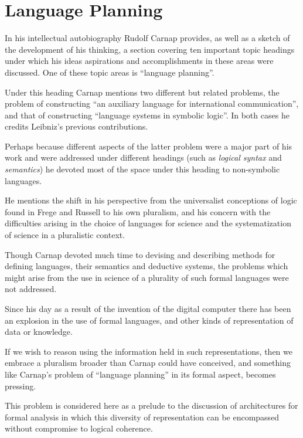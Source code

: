 
\chapter{Language Planning}\label{LanguagePlanning}

In his intellectual autobiography \cite{carnap63} Rudolf Carnap
provides, as well as a sketch of the development of his thinking, a
section covering ten important topic headings under which his ideas
aspirations and accomplishments in these areas were discussed. 
One of these topic areas is ``language planning''.

Under this heading Carnap mentions two different but related problems,
the problem of constructing ``an auxiliary language for international
communication'', and that of constructing ``language systems in
symbolic logic''. 
In both cases he credits Leibniz's previous contributions.

Perhaps because different aspects of the latter problem were a major
part of his work and were addressed under different headings (such as
\emph{logical syntax} and \emph{semantics}) he devoted most of the
space under this heading to non-symbolic languages.

He mentions the shift in his perspective from the universalist
conceptions of logic found in Frege and Russell to his own pluralism,
and his concern with the difficulties arising in the choice of
languages for science and the systematization of science in a
pluralistic context. 

Though Carnap devoted much time to devising and describing methods for
defining languages, their semantics and deductive systems, the
problems which might arise from the use in science of a plurality of
such formal languages were not addressed. 

Since his day as a result of the invention of the digital computer
there has been an explosion in the use of formal languages, and other
kinds of representation of data or knowledge.

If we wish to reason using the information held in such
representations, then we embrace a pluralism broader than Carnap could
have conceived, and something like Carnap's problem of ``language
planning'' in its formal aspect, becomes pressing.

This problem is considered here as a prelude to the discussion of
architectures for formal analysis in which this diversity of
representation can be encompassed without compromise to logical
coherence.


